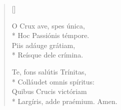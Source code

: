 \begin{verse}[\versewidth]

O Crux ave, spes única,                     \\*
Hoc Passiónis témpore.                   \\
Piis adáuge grátiam,                        \\*
Reísque dele crímina.                       

Te, fons salútis Trínitas,                  \\*
Colláudet omnis spíritus:                   \\
Quibus Crucis victóriam\\*
Largíris, adde praémium. Amen.

\end{verse}

